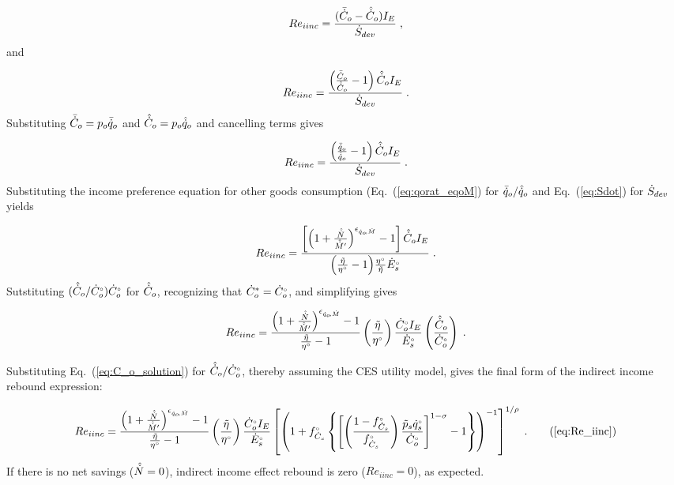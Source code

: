 \begin{equation}
  Re_{iinc} = \frac{(\bar{\dot{C}}_o - \hat{\dot{C}}_o) I_E}{\dot{S}_{dev}} \; , 
\end{equation}
%
and

\begin{equation}
  Re_{iinc} = \frac{\left( \frac{\bar{\dot{C}}_o}{\hat{\dot{C}}_o} - 1  \right) \hat{\dot{C}}_o I_E}{\dot{S}_{dev}} \; .
\end{equation}
%
Substituting $\bar{\dot{C}}_o = p_o \bar{\dot{q}}_o$ and $\hat{\dot{C}}_o = p_o \hat{\dot{q}}_o$ and
cancelling terms gives

\begin{equation}
  Re_{iinc} = \frac{\left( \frac{\bar{\dot{q}}_o}{\hat{\dot{q}}_o} - 1  \right) \hat{\dot{C}}_o I_E}{\dot{S}_{dev}} \; .
\end{equation}
%
Substituting the income preference equation for other goods consumption (Eq.~(\ref{eq:qorat_eqoM}) 
for $\bar{\dot{q}}_o / \hat{\dot{q}}_o$
and Eq.~(\ref{eq:Sdot}) for $\dot{S}_{dev}$ yields

\begin{equation}
  Re_{iinc} = \frac{\left[ \left( 1 + \frac{\hat{\dot{N}}}{\hat{\dot{M}}^\prime} \right)^{\epsilon_{\dot{q}_o\!,\dot{M}}} - 1  \right] 
              \hat{\dot{C}}_o I_E}{\left( \frac{\tilde{\eta}}{{}{\eta}^{\scriptscriptstyle \circ}} - 1 \right)\! \frac{{}{\eta}^{\scriptscriptstyle \circ}}{\tilde{\eta}} {}{\dot{E}}^{\scriptscriptstyle \circ}_s} \; .
\end{equation}
%
Sutstituting $(\hat{\dot{C}}_o/{}{\dot{C}}^{\scriptscriptstyle \circ}_o) {}{\dot{C}}^{\scriptscriptstyle \circ}_o$ for $\hat{\dot{C}}_o$,  
recognizing that ${\dot{C}}^*_o = {}{\dot{C}}^{\scriptscriptstyle \circ}_o$, and simplifying gives 

\begin{equation}
  Re_{iinc} = \frac{\left( 1 + \frac{\hat{\dot{N}}}{\hat{\dot{M}}^\prime} \right)^{\epsilon_{\dot{q}_o\!,\dot{M}}} - 1}{\frac{\tilde{\eta}}{{}{\eta}^{\scriptscriptstyle \circ}} - 1} 
              \left( \frac{\tilde{\eta}}{{}{\eta}^{\scriptscriptstyle \circ}} \right)
              \frac{{}{\dot{C}}^{\scriptscriptstyle \circ}_o I_E}{{}{\dot{E}}^{\scriptscriptstyle \circ}_s}
              \left( \frac{\hat{\dot{C}}_o}{{}{\dot{C}}^{\scriptscriptstyle \circ}_o} \right) \; .
\end{equation}

Substituting Eq.~(\ref{eq:C_o_solution}) 
for $\hat{\dot{C}}_o / {}{\dot{C}}^{\scriptscriptstyle \circ}_o$, 
thereby assuming the CES utility model,
gives the final form 
of the indirect income rebound expression:

\begin{equation}
  Re_{iinc} = \Reiinceqnexact{} \; . \tag{\ref{eq:Re_iinc}}
\end{equation}
%
If there is no net savings ($\hat{\dot{N}} = 0$), 
indirect income effect rebound is zero ($Re_{iinc} = 0$), as expected.


\subsubsection{\Macroeffect{}} 
\label{sec:Re_macro}

